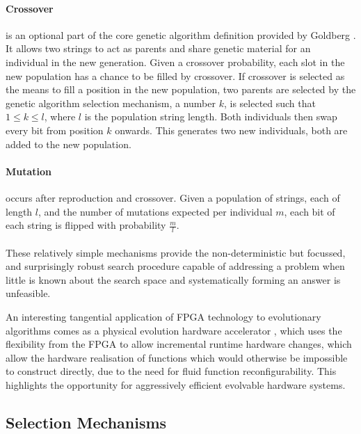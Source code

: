 \paragraph{Crossover} is an optional part of the core genetic algorithm definition
provided by Goldberg \cite{Goldberg:1989:GAS:534133}. It
allows two strings to act as parents and share genetic material for an individual
in the new generation. Given a crossover probability, each slot in the new population
has a chance to be filled by crossover. If crossover is selected as the means to
fill a position in the new population, two parents are selected by the genetic
algorithm selection mechanism, a number $k$,
is selected such that $1 \leq k \leq l$, where $l$ is the population string length.
Both individuals then swap every bit from position $k$ onwards. This generates two
new individuals, both are added to the new population.

\paragraph{Mutation}
occurs after reproduction and crossover. Given a population of strings, each of length
$l$, and the number of mutations expected per individual $m$, each bit of each string
is flipped with probability $\frac{m}{l}$.

\paragraph{}
These relatively simple mechanisms provide the non-deterministic but focussed,
and surprisingly robust search procedure capable of addressing a problem when
little is known about the search space and systematically forming an answer is
unfeasible.

An interesting tangential application of FPGA technology to evolutionary algorithms comes as
a physical evolution hardware accelerator \cite{1377261}, which uses the flexibility from the
FPGA to allow incremental runtime hardware changes, which allow the hardware realisation of
functions which would otherwise be impossible to construct directly, due to the
need for fluid function reconfigurability.
This highlights the opportunity for aggressively efficient evolvable hardware
systems.

\subsection{Selection Mechanisms}

